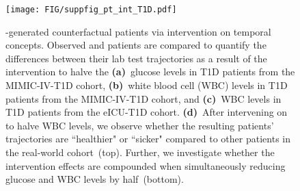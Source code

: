 \begin{figure}[ht]
\begin{center}
\centerline{\texttt{[image: FIG/suppfig\_pt\_int\_T1D.pdf]}}
\caption{\name-generated counterfactual patients via intervention on temporal concepts. Observed and \name patients are compared to quantify the differences between their lab test trajectories as a result of the intervention to halve the \textbf{(a)}~glucose levels in T1D patients from the MIMIC-IV-T1D cohort, \textbf{(b)}~white blood cell (WBC) levels in T1D patients from the MIMIC-IV-T1D cohort, and \textbf{(c)}~WBC levels in T1D patients from the eICU-T1D cohort. \textbf{(d)}~After intervening on \name to halve WBC levels, we observe whether the resulting \name patients' trajectories are ``healthier" or ``sicker" compared to other patients in the real-world cohort~(top). Further, we investigate whether the intervention effects are compounded when simultaneously reducing glucose and WBC levels by half~(bottom).}
\label{fig:supp_t1d}
\end{center}
\end{figure}
